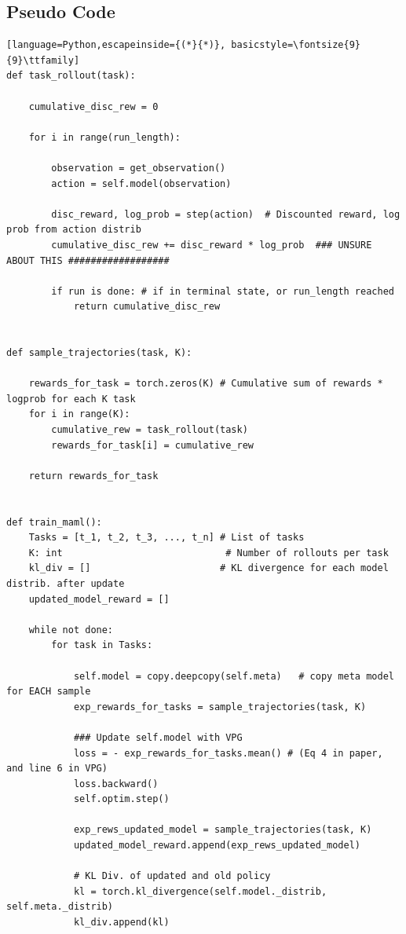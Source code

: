 \documentclass{article}
\theoremstyle{definition}
\theoremstyle{note}
\begin{document}
\subsection*{Pseudo Code}
\begin{lstlisting}[language=Python,escapeinside={(*}{*)}, basicstyle=\fontsize{9}{9}\ttfamily]
def task_rollout(task):
     
    cumulative_disc_rew = 0

    for i in range(run_length):

        observation = get_observation()
        action = self.model(observation)

        disc_reward, log_prob = step(action)  # Discounted reward, log prob from action distrib
        cumulative_disc_rew += disc_reward * log_prob  ### UNSURE ABOUT THIS ##################

        if run is done: # if in terminal state, or run_length reached
            return cumulative_disc_rew  


def sample_trajectories(task, K):

    rewards_for_task = torch.zeros(K) # Cumulative sum of rewards * logprob for each K task 
    for i in range(K):
        cumulative_rew = task_rollout(task)
        rewards_for_task[i] = cumulative_rew

    return rewards_for_task  


def train_maml():
    Tasks = [t_1, t_2, t_3, ..., t_n] # List of tasks 
    K: int                             # Number of rollouts per task
    kl_div = []                       # KL divergence for each model distrib. after update
    updated_model_reward = []

    while not done:
        for task in Tasks:

            self.model = copy.deepcopy(self.meta)   # copy meta model for EACH sample 
            exp_rewards_for_tasks = sample_trajectories(task, K)
            
            ### Update self.model with VPG
            loss = - exp_rewards_for_tasks.mean() # (Eq 4 in paper, and line 6 in VPG)
            loss.backward()  
            self.optim.step()
            
            exp_rews_updated_model = sample_trajectories(task, K)
            updated_model_reward.append(exp_rews_updated_model)

            # KL Div. of updated and old policy
            kl = torch.kl_divergence(self.model._distrib, self.meta._distrib)
            kl_div.append(kl)
        

\end{lstlisting}
\end{document}
